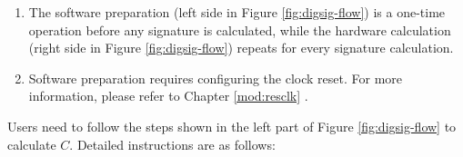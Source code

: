 \documentclass[main\_\_EN.tex]{subfiles}
\begin{document}
\begin{tiplisting}
\vspace{-2.5em}
\begin{enumerate}
\item The software preparation (left side in Figure \ref{fig:digsig-flow}) is a one-time operation before any signature is calculated, while the hardware calculation (right side in Figure \ref{fig:digsig-flow}) repeats for every signature calculation.
\item Software preparation requires configuring the clock reset. For more information, please refer to Chapter \ref{mod:resclk} \textit{}.
\end{enumerate}
\end{tiplisting}


Users need to follow the steps shown in the left part of Figure \ref{fig:digsig-flow} to calculate \begin{math}C\end{math}. Detailed instructions are as follows:
\end{document}
